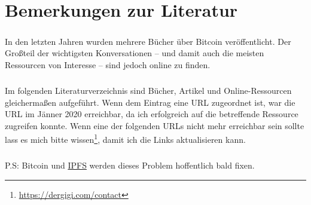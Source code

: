 \chapter*{Bemerkungen zur Literatur}

\paragraph{}
In den letzten Jahren wurden mehrere Bücher über Bitcoin veröffentlicht. Der
Großteil der wichtigsten Konversationen -- und damit auch die meisten Ressourcen
von Interesse -- sind jedoch online zu finden.

\paragraph{}
Im folgenden Literaturverzeichnis sind Bücher, Artikel und Online-Ressourcen
gleichermaßen aufgeführt. Wenn dem Eintrag eine URL zugeordnet ist, war die URL
im Jänner 2020 erreichbar, da ich erfolgreich auf die betreffende Ressource
zugreifen konnte. Wenn eine der folgenden URLs nicht mehr erreichbar sein sollte
lass es mich bitte wissen\footnote{\url{https://dergigi.com/contact}}, damit ich
die Links aktualisieren kann.

\paragraph{}
P.S: Bitcoin und \href{https://ipfs.io/}{IPFS} werden dieses Problem hoffentlich
bald fixen.
